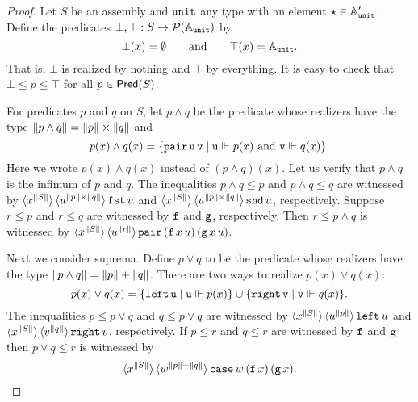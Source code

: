 \begin{proof}
  Let $S$ be an assembly and $\mathtt{unit}$ any type with an element
  ${\star} \in \mathbb{A}'_{\mathtt{unit}}$. Define the predicates $\bot, \top :
  S \to \mathcal{P}(\mathbb{A}_{\mathtt{unit}})$ by
  \begin{equation*}
    \bot(x) = \emptyset
    \qquad\text{and}\qquad
    \top(x) = \mathbb{A}_{\mathtt{unit}}.
  \end{equation*}
  That is, $\bot$ is realized by nothing and $\top$ by everything. It is
  easy to check that $\bot \leq p \leq \top$ for all $p \in
  \mathsf{Pred}(S)$.

  For predicates $p$ and $q$ on $S$, let $p \land q$ be the
  predicate whose realizers have the type $\|p \land q\| = \|p\| \times
  \|q\|$ and
  \begin{equation*}
    p(x) \land q(x) = \{\mathtt{pair}\,\mathtt{u}\,\mathtt{v} \mid
    \text{$\mathtt{u} \Vdash_{} p(x)$ and $\mathtt{v} \Vdash_{} q(x)$}\}.
  \end{equation*}
  Here we wrote $p(x) \land q(x)$ instead of $(p \land q)(x)$. Let us
  verify that $p \land q$ is the infimum of $p$ and $q$. The
  inequalities $p \land q \leq p$ and $p \land q \leq q$ are witnessed
  by $\langle x^{\|S\|} \rangle\, \langle u^{\|p\| \times \|q\|} \rangle\,{\mathtt{fst}\,u}$
  and $\langle x^{\|S\|} \rangle\, \langle u^{\|p\| \times
      \|q\|} \rangle\,{\mathtt{snd}\,u}$, respectively. Suppose $r \leq p$ and $r
  \leq q$ are witnessed by $\mathtt{f}$ and $\mathtt{g}$, respectively. Then $r
  \leq p \land q$ is witnessed by $\langle x^{\|S\|} \rangle\,
    \langle u^{\|r\|} \rangle\,{\mathtt{pair}\, (\mathtt{f}\,x\,u)\, (\mathtt{g}\,x\,u)}$.

  Next we consider suprema. Define $p \lor q$ to be the predicate
  whose realizers have the type $\|p \land q\| = \|p\| + \|q\|$. There are
  two ways to realize $p(x) \lor q(x)$:
  \begin{equation*}
    p(x) \lor q(x) =
    \{\mathtt{left}\,\mathtt{u} \mid \mathtt{u} \Vdash_{} p(x)\} \cup
    \{\mathtt{right}\,\mathtt{v} \mid \mathtt{v} \Vdash_{} q(x)\}.
  \end{equation*}
  The inequalities $p \leq p \lor q$ and $q \leq p \lor q$ are
  witnessed by $\langle x^{\|S\|} \rangle\, \langle u^{\|p\|} \rangle\,{\mathtt{left}\,u}$
  and $\langle x^{\|S\|} \rangle\, \langle v^{\|q\|} \rangle\,{\mathtt{right}\,v}$,
  respectively. If $p \leq r$ and $q \leq r$ are witnessed by $\mathtt{f}$
  and $\mathtt{g}$ then $p \lor q \leq r$ is witnessed by
  \begin{equation*}
    \langle x^{\|S\|} \rangle\, \langle w^{\|p\|+\|q\|} \rangle\,{
      \mathtt{case}\,w\,(\mathtt{f}\,x)\,(\mathtt{g}\,x)
    }.
  \end{equation*}
  

\end{proof}
